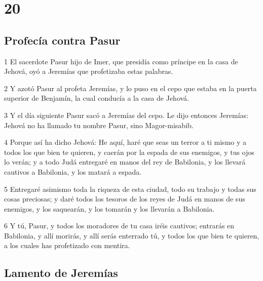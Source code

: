 \chapter{20}

\section*{Profecía contra Pasur}

\par 1 El sacerdote Pasur hijo de Imer, que presidía como príncipe en la casa de Jehová, oyó a Jeremías que profetizaba estas palabras.
\par 2 Y azotó Pasur al profeta Jeremías, y lo puso en el cepo que estaba en la puerta superior de Benjamín, la cual conducía a la casa de Jehová.
\par 3 Y el día siguiente Pasur sacó a Jeremías del cepo. Le dijo entonces Jeremías: Jehová no ha llamado tu nombre Pasur, sino Magor-misabib.
\par 4 Porque así ha dicho Jehová: He aquí, haré que seas un terror a ti mismo y a todos los que bien te quieren, y caerán por la espada de sus enemigos, y tus ojos lo verán; y a todo Judá entregaré en manos del rey de Babilonia, y los llevará cautivos a Babilonia, y los matará a espada.
\par 5 Entregaré asimismo toda la riqueza de esta ciudad, todo su trabajo y todas sus cosas preciosas; y daré todos los tesoros de los reyes de Judá en manos de sus enemigos, y los saquearán, y los tomarán y los llevarán a Babilonia.
\par 6 Y tú, Pasur, y todos los moradores de tu casa iréis cautivos; entrarás en Babilonia, y allí morirás, y allí serás enterrado tú, y todos los que bien te quieren, a los cuales has profetizado con mentira.

\section*{Lamento de Jeremías}

